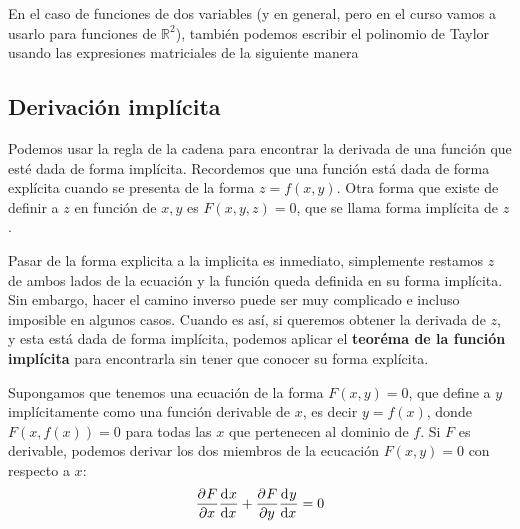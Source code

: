 \documentclass[12pt]{article}
\begin{document}
En el caso de funciones de dos variables (y en general, pero en el curso vamos a usarlo para funciones de $ \mathbb{R}^{2} $), también podemos escribir el polinomio de Taylor usando las expresiones matriciales de la siguiente manera

\vspace{0.2cm}
\vspace{0.2cm}

\subsection{Derivación implícita}
Podemos usar la regla de la cadena para encontrar la derivada de una función que esté dada de forma implícita. Recordemos que una función está dada de forma explícita cuando se presenta de la forma $ z=f(x,y) $. Otra forma que existe de definir a $ z $ en función de $ x,y $ es $ F(x,y,z)=0 $, que se llama forma implícita de $ z $. 

Pasar de la forma explicita a la implicita es inmediato, simplemente restamos $ z $ de ambos lados de la ecuación y la función queda definida en su forma implícita. Sin embargo, hacer el camino inverso puede ser muy complicado e incluso imposible en algunos casos. Cuando es así, si queremos obtener la derivada de $ z $, y esta está dada de forma implícita, podemos aplicar el \textbf{teoréma de la función implícita} para encontrarla sin tener que conocer su forma explícita.

Supongamos que tenemos una ecuación de la forma $ F(x,y)=0 $, que define a $ y $ implícitamente como una función derivable de $ x $, es decir $ y = f(x) $, donde $ F(x,f(x)) =0 $ para todas las $ x $ que pertenecen al dominio de $ f $. Si $ F $ es derivable, podemos derivar los dos miembros de la ecucación $ F(x,y)=0 $ con respecto a $ x $:
\[
\pdv[]{F}{x}\dv[]{x}{x} + \pdv[]{F}{y}\dv[]{y}{x} = 0
\]
\end{document}
